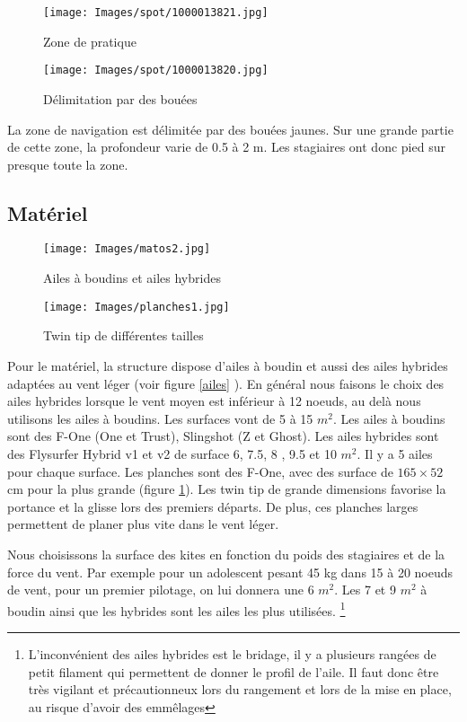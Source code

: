 \documentclass[11pt,a4paper]{report}
\begin{document}
\begin{figure}
\begin{minipage}{0.4\textwidth}
\texttt{[image: Images/spot/1000013821.jpg]} 
\caption{Zone de pratique}
\end{minipage}
\hfill
\begin{minipage}{0.4\textwidth}
\texttt{[image: Images/spot/1000013820.jpg]} 
\caption{Délimitation par des bouées}
\end{minipage}
\end{figure}
La zone de navigation est délimitée par des bouées jaunes.
Sur une grande partie de cette zone, la profondeur varie de 0.5 à 2 m.
Les stagiaires ont donc pied sur presque toute la zone.

\FloatBarrier
\subsection{Matériel}
\begin{figure}[h]
\begin{minipage}{0.4\textwidth}
\texttt{[image: Images/matos2.jpg]} 
\caption{Ailes à boudins et ailes hybrides\label{ailes}}
\end{minipage}
\hfill
\begin{minipage}{0.4\textwidth}
\texttt{[image: Images/planches1.jpg]} 
\caption{Twin tip de différentes tailles\label{planches}}
\end{minipage}
\end{figure}
Pour le matériel, la structure dispose d'ailes à boudin et aussi 
des ailes hybrides adaptées au vent léger (voir figure \ref{ailes} ).
En général nous faisons
le choix des ailes hybrides lorsque le vent moyen est inférieur à
12 noeuds, au delà nous utilisons les ailes à boudins. Les
surfaces vont de 5 à 15 $m^2$. 
Les ailes à boudins sont des F-One (One et Trust), Slingshot (Z et Ghost).
Les ailes hybrides sont des Flysurfer Hybrid v1 et v2 de surface 6, 7.5, 8 , 9.5 et 10 $m^2$.
Il y a 5 ailes pour chaque surface.
Les planches sont des F-One, avec des surface de $165\times52$ cm pour la plus grande (figure \ref{planches}).
Les twin tip de grande dimensions favorise la portance et la glisse
lors des premiers départs. De plus, ces planches larges permettent de planer plus vite
dans le vent léger.

Nous choisissons la surface des kites
en fonction du poids des stagiaires et de la force du vent.
Par exemple pour un adolescent pesant 45 kg dans 15 à 20 noeuds
de vent, pour un premier pilotage, on lui donnera une 6 $m^2$.
Les 7 et 9 $m^2$ à boudin ainsi que  les hybrides sont les ailes les plus utilisées.
\footnote{L'inconvénient des ailes hybrides est le bridage, il y a plusieurs
rangées de petit filament qui permettent
de donner le profil de l'aile. Il faut donc \^etre très vigilant et précautionneux
lors du rangement et lors de la mise en place, au risque d'avoir des emm\^elages}
\end{document}
